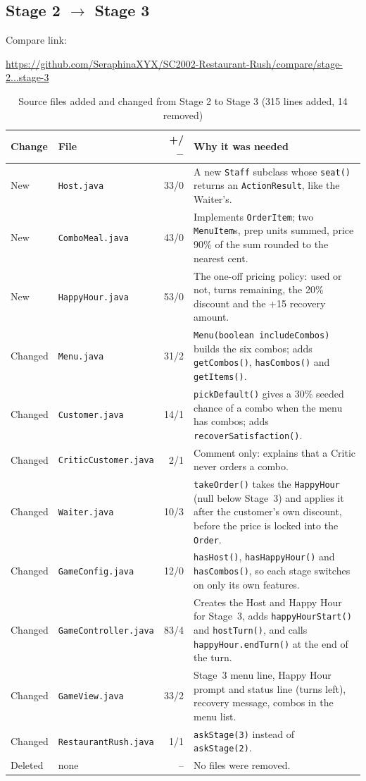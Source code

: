\subsection{Stage 2 $\rightarrow$ Stage 3}

Compare link:
\begin{center}{\small\url{https://github.com/SeraphinaXYX/SC2002-Restaurant-Rush/compare/stage-2...stage-3}}\end{center}

\begin{table}[H]
\centering
\small
\begin{tabularx}{\textwidth}{l l r X}
\toprule
\textbf{Change} & \textbf{File} & \textbf{+/$-$} & \textbf{Why it was needed} \\
\midrule
New & \texttt{Host.java} & 33/0 & A new \texttt{Staff} subclass whose \texttt{seat()} returns an \texttt{ActionResult}, like the Waiter's. \\
New & \texttt{ComboMeal.java} & 43/0 & Implements \texttt{OrderItem}; two \texttt{MenuItem}s, prep units summed, price 90\% of the sum rounded to the nearest cent. \\
New & \texttt{HappyHour.java} & 53/0 & The one-off pricing policy: used or not, turns remaining, the 20\% discount and the +15 recovery amount. \\
Changed & \texttt{Menu.java} & 31/2 & \texttt{Menu(boolean includeCombos)} builds the six combos; adds \texttt{getCombos()}, \texttt{hasCombos()} and \texttt{getItems()}. \\
Changed & \texttt{Customer.java} & 14/1 & \texttt{pickDefault()} gives a 30\% seeded chance of a combo when the menu has combos; adds \texttt{recoverSatisfaction()}. \\
Changed & \texttt{CriticCustomer.java} & 2/1 & Comment only: explains that a Critic never orders a combo. \\
Changed & \texttt{Waiter.java} & 10/3 & \texttt{takeOrder()} takes the \texttt{HappyHour} (null below Stage~3) and applies it after the customer's own discount, before the price is locked into the \texttt{Order}. \\
Changed & \texttt{GameConfig.java} & 12/0 & \texttt{hasHost()}, \texttt{hasHappyHour()} and \texttt{hasCombos()}, so each stage switches on only its own features. \\
Changed & \texttt{GameController.java} & 83/4 & Creates the Host and Happy Hour for Stage~3, adds \texttt{happyHourStart()} and \texttt{hostTurn()}, and calls \texttt{happyHour.endTurn()} at the end of the turn. \\
Changed & \texttt{GameView.java} & 33/2 & Stage~3 menu line, Happy Hour prompt and status line (turns left), recovery message, combos in the menu list. \\
Changed & \texttt{RestaurantRush.java} & 1/1 & \texttt{askStage(3)} instead of \texttt{askStage(2)}. \\
Deleted & none & -- & No files were removed. \\
\bottomrule
\end{tabularx}
\caption{Source files added and changed from Stage 2 to Stage 3 (315 lines added, 14 removed)}
\end{table}

